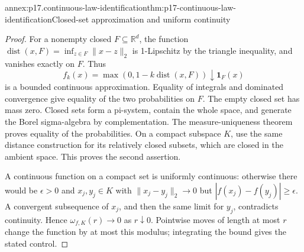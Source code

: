 \begin{annexitem}{annex:p17.continuous-law-identification}{thm:p17-continuous-law-identification}{Closed-set approximation and uniform continuity}
\begin{proof}
For a nonempty closed \(F\subseteq\mathbb R^d\), the function
\(\operatorname{dist}(x,F)=\inf_{z\in F}\|x-z\|_2\)
is 1-Lipschitz by the triangle inequality, and vanishes exactly on \(F\).
Thus
\[
              f_k(x)=\max(0,1-k\operatorname{dist}(x,F))
                               \downarrow\mathbf1_F(x)
\]
is a bounded continuous approximation.
Equality of integrals and dominated convergence give equality of the
two probabilities on \(F\). The empty closed set has mass zero.
Closed sets form a pi-system, contain the whole space, and generate
the Borel sigma-algebra by complementation. The measure-uniqueness
theorem proves equality of the probabilities.
On a compact subspace \(K\), use the same distance construction for
its relatively closed subsets, which are closed in the ambient space.
This proves the second assertion.

A continuous function on a compact set is uniformly continuous:
otherwise there would be \(\epsilon>0\) and \(x_j,y_j\in K\) with
\(\|x_j-y_j\|_2\to0\) but \(|f(x_j)-f(y_j)|\geq\epsilon\).
A convergent subsequence of \(x_j\), and then the same limit for \(y_j\),
contradicts continuity. Hence \(\omega_{f,K}(r)\to0\) as \(r\downarrow0\).
Pointwise moves of length at most \(r\) change the function by at most
this modulus; integrating the bound gives the stated control.
\end{proof}
\end{annexitem}

